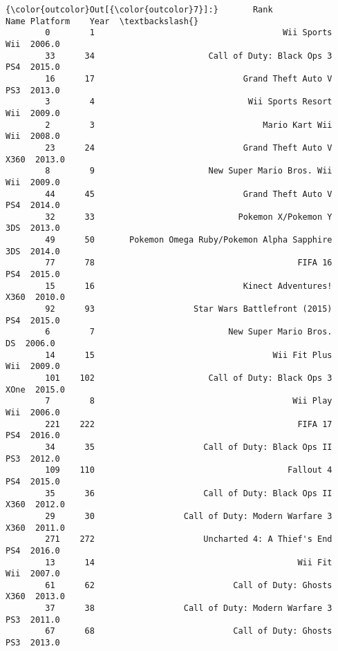\documentclass[11pt]{article}
\begin{document}
\begin{Verbatim}[commandchars=\\\{\}]
{\color{outcolor}Out[{\color{outcolor}7}]:}       Rank                                            Name Platform    Year  \textbackslash{}
        0        1                                      Wii Sports      Wii  2006.0   
        33      34                       Call of Duty: Black Ops 3      PS4  2015.0   
        16      17                              Grand Theft Auto V      PS3  2013.0   
        3        4                               Wii Sports Resort      Wii  2009.0   
        2        3                                  Mario Kart Wii      Wii  2008.0   
        23      24                              Grand Theft Auto V     X360  2013.0   
        8        9                       New Super Mario Bros. Wii      Wii  2009.0   
        44      45                              Grand Theft Auto V      PS4  2014.0   
        32      33                             Pokemon X/Pokemon Y      3DS  2013.0   
        49      50       Pokemon Omega Ruby/Pokemon Alpha Sapphire      3DS  2014.0   
        77      78                                         FIFA 16      PS4  2015.0   
        15      16                              Kinect Adventures!     X360  2010.0   
        92      93                    Star Wars Battlefront (2015)      PS4  2015.0   
        6        7                           New Super Mario Bros.       DS  2006.0   
        14      15                                    Wii Fit Plus      Wii  2009.0   
        101    102                       Call of Duty: Black Ops 3     XOne  2015.0   
        7        8                                        Wii Play      Wii  2006.0   
        221    222                                         FIFA 17      PS4  2016.0   
        34      35                      Call of Duty: Black Ops II      PS3  2012.0   
        109    110                                       Fallout 4      PS4  2015.0   
        35      36                      Call of Duty: Black Ops II     X360  2012.0   
        29      30                  Call of Duty: Modern Warfare 3     X360  2011.0   
        271    272                      Uncharted 4: A Thief's End      PS4  2016.0   
        13      14                                         Wii Fit      Wii  2007.0   
        61      62                            Call of Duty: Ghosts     X360  2013.0   
        37      38                  Call of Duty: Modern Warfare 3      PS3  2011.0   
        67      68                            Call of Duty: Ghosts      PS3  2013.0   

\end{Verbatim}
\end{document}
